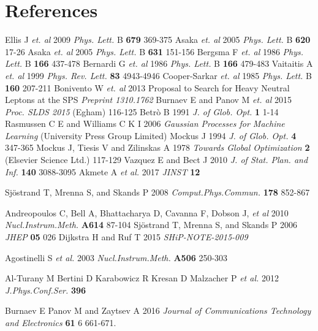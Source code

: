 \documentclass[a4paper]{jpconf}
\theoremstyle{my_theorem_style}
\numberwithin{equation}{section}
\begin{document}

\section*{References}

\begin{thebibliography}{9}
 Ellis J {\it et. al} 2009 {\it Phys. Lett.} B {\bf679} 369-375
 Asaka  {\it et. al} 2005 {\it Phys. Lett.} B {\bf 620} 17-26
 Asaka {\it et. al} 2005 {\it Phys. Lett.} B {\bf 631} 151-156
 Bergsma F {\it et. al} 1986 {\it Phys. Lett.} B {\bf 166} 437-478
 Bernardi G {\it et. al} 1986 {\it Phys. Lett.} B {\bf 166} 479-483
 Vaitaitis A {\it et. al} 1999 {\it Phys. Rev. Lett.} {\bf 83} 4943-4946
 Cooper-Sarkar {\it et. al} 1985 {\it Phys. Lett.} B {\bf 160} 207-211
 Bonivento W {\it et. al} 2013 Proposal to Search for Heavy Neutral Leptons at the SPS {\it Preprint 1310.1762}
 Burnaev E and Panov M {\it et. al} 2015 {\it Proc. SLDS 2015} (Egham) 116-125
 Betr{\`o} B 1991 {\it J. of Glob. Opt.} {\bf 1} 1-14
 Rasmussen C E and Williams C K I 2006 {\it Gaussian Processes for Machine Learning} (University Press Group Limited)
 Mockus J 1994 {\it J. of Glob. Opt.} {\bf 4} 347-365
 Mockus J, Tiesis V and Zilinskas A 1978 {\it Towards Global Optimization} {\bf 2} (Elsevier Science Ltd.) 117-129
 Vazquez E and Bect J 2010 {\it J. of Stat. Plan. and Inf.} {\bf 140} 3088-3095
 Akmete A {\it et al.} 2017 {\it JINST} {\bf 12}

Sj\"{o}strand T, Mrenna S, and Skands P  2008
\emph{Comput.Phys.Commun.} \textbf{178} 852-867

Andreopoulos C, Bell A, Bhattacharya D, Cavanna F, Dobson J, {\it et al} 2010 \emph{Nucl.Instrum.Meth.} \textbf{A614} 87-104
Sj\"{o}strand T, Mrenna S, and Skands P 2006 \emph{JHEP} \textbf{05} 026
Dijkstra H and Ruf T 2015 {\it SHiP-NOTE-2015-009}

Agostinelli S {\it et al.} 2003 \emph{Nucl.Instrum.Meth.} \textbf{A506} 250-303

Al-Turany M Bertini D Karabowicz R Kresan D Malzacher P {\it et al.} 2012 \emph{J.Phys.Conf.Ser.} \textbf{396} 

 Burnaev E Panov M and Zaytsev A 2016 {\it Journal of Communications Technology and Electronics} {\bf 61} 6 661-671.
\end{thebibliography}


\appendix
\end{document}
